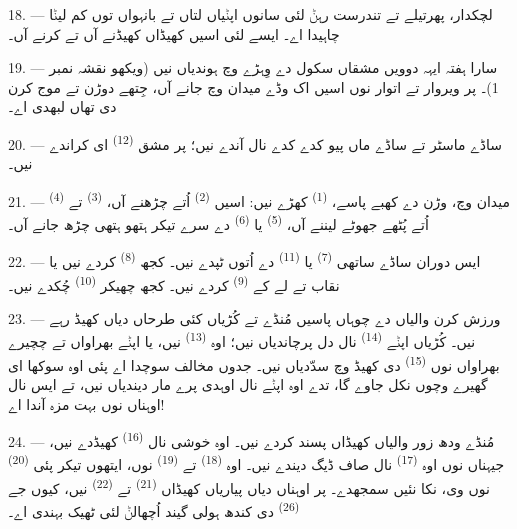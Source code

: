 18. --- لچکدار، پھرتیلے تے تندرست رہݨ لئی سانوں اپݨیاں لتاں تے بانہواں توں کم
لیݨا چاہیدا اے۔ ایسے لئی اسیں کھیڈاں کھیڈنے آں تے  کرنے آں۔

19. --- سارا ہفتہ ایہہ دوویں مشقاں سکول دے وِہڑے وچ ہوندیاں نیں (ویکھو نقشہ
نمبر 1)۔ پر ویروار تے اتوار نوں اسیں اک وڈے میدان وچ جانے آں، جِتھے دوڑن تے
موج کرن دی تھاں لبھدی اے۔

20. --- ساڈے ماسٹر تے ساڈے ماں پیو کدے کدے نال آندے نیں؛ پر مشق
 \textsuperscript{(12)} ای کراندے نیں۔

21. --- میدان وچ، وڑن دے کھبے پاسے، 
\textsuperscript{(1)} کھڑے نیں: اسیں  \textsuperscript{(2)} اُتے
چڑھنے آں،  \textsuperscript{(3)} تے 
\textsuperscript{(4)} اُتے پُٹھے جھوٹے لیننے آں، 
\textsuperscript{(5)} یا  \textsuperscript{(6)} دے سرے تیکر
ہتھو ہتھی چڑھ جانے آں۔

22. --- ایس دوران ساڈے ساتھی  \textsuperscript{(7)} یا
 \textsuperscript{(11)} دے اُتوں ٹپدے نیں۔ کجھ
 \textsuperscript{(8)} کردے نیں یا نقاب تے  لے کے
 \textsuperscript{(9)} کردے نیں۔ کجھ چھیکر 
\textsuperscript{(10)} چُکدے نیں۔

\VUsaut{4.6mm}
\VUsaut{3.0mm}

23. --- ورزش کرن والیاں دے چوہاں پاسیں مُنڈے تے کُڑیاں کئی طرحاں دیاں
 کھیڈ رہے نیں۔ کُڑیاں اپݨے  \textsuperscript{(14)}
نال دل پرچاندیاں نیں؛ اوہ  \textsuperscript{(13)} نیں، یا
اپݨے بھراواں تے چچیرے بھراواں نوں  \textsuperscript{(15)} دی کھیڈ
وچ سدّدیاں نیں۔ جدوں مخالف سوچدا اے پئی اوہ سوکھا ای گھیرے وچوں نکل جاوے گا،
تدے اوہ اپݨے  نال اوہدی  پرے مار دیندیاں
نیں، تے ایس نال اوہناں نوں بہت مزہ آندا اے!

24. --- مُنڈے ودھ زور والیاں کھیڈاں پسند کردے نیں۔ اوہ خوشی نال
 \textsuperscript{(16)} کھیڈدے نیں، جیہناں نوں اوہ
 \textsuperscript{(17)} نال صاف ڈیگ دیندے نیں۔ اوہ 
\textsuperscript{(18)} تے  \textsuperscript{(19)} نوں، ایتھوں تیکر
پئی  \textsuperscript{(20)} نوں وی، نکا نئیں سمجھدے۔ پر
اوہناں دیاں پیاریاں کھیڈاں  \textsuperscript{(21)} تے
 \textsuperscript{(22)} نیں، کیوں جے 
\textsuperscript{(26)} دی کندھ ہولی گیند اُچھالݨ لئی ٹھیک بہندی اے۔

